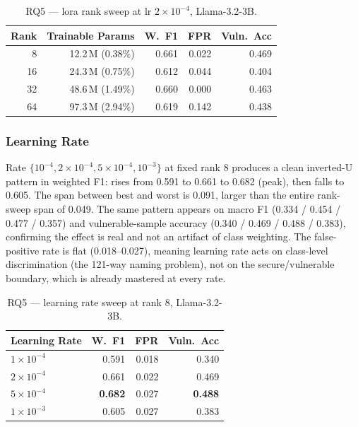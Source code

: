 \begin{table}[H]
\centering
\caption{RQ5 --- \gls{lora} rank sweep at lr $2\times10^{-4}$, Llama-3.2-3B.}
\label{tab:rq5_rank}
\footnotesize
\begin{tabular}{r r r r r}
\toprule
\textbf{Rank} & \textbf{Trainable Params} & \textbf{W.\ F1} & \textbf{FPR} & \textbf{Vuln.\ Acc} \\
\midrule
8  & 12.2\,M (0.38\%) & 0.661 & 0.022 & 0.469 \\
16 & 24.3\,M (0.75\%) & 0.612 & 0.044 & 0.404 \\
32 & 48.6\,M (1.49\%) & 0.660 & 0.000 & 0.463 \\
64 & 97.3\,M (2.94\%) & 0.619 & 0.142 & 0.438 \\
\bottomrule
\end{tabular}
\end{table}

\subsubsection{Learning Rate}

Rate $\{10^{-4}, 2\times10^{-4}, 5\times10^{-4}, 10^{-3}\}$ at fixed rank 8 produces a clean inverted-U pattern in weighted F1: rises from 0.591 to 0.661 to 0.682 (peak), then falls to 0.605. The span between best and worst is 0.091, larger than the entire rank-sweep span of 0.049. The same pattern appears on macro F1 (0.334 / 0.454 / 0.477 / 0.357) and vulnerable-sample accuracy (0.340 / 0.469 / 0.488 / 0.383), confirming the effect is real and not an artifact of class weighting. The false-positive rate is flat (0.018--0.027), meaning learning rate acts on class-level discrimination (the 121-way naming problem), not on the secure/vulnerable boundary, which is already mastered at every rate.

\begin{table}[H]
\centering
\caption{RQ5 --- learning rate sweep at rank 8, Llama-3.2-3B.}
\label{tab:rq5_lr}
\footnotesize
\begin{tabular}{l r r r}
\toprule
\textbf{Learning Rate} & \textbf{W.\ F1} & \textbf{FPR} & \textbf{Vuln.\ Acc} \\
\midrule
$1\times10^{-4}$ & 0.591 & 0.018 & 0.340 \\
$2\times10^{-4}$ & 0.661 & 0.022 & 0.469 \\
$5\times10^{-4}$ & \textbf{0.682} & 0.027 & \textbf{0.488} \\
$1\times10^{-3}$ & 0.605 & 0.027 & 0.383 \\
\bottomrule
\end{tabular}
\end{table}

